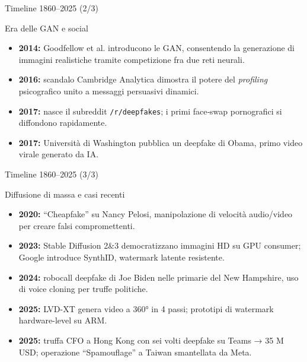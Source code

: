 \documentclass[12pt]{beamer}
\begin{document}
\begin{frame}{Timeline 1860–2025 (2/3)}
  \begin{alertblock}{Era delle GAN e social}
    \begin{itemize}
      \item \textbf{2014:} Goodfellow et al. introducono le GAN, consentendo la generazione di immagini realistiche tramite competizione fra due reti neurali.
      \item \textbf{2016:} scandalo Cambridge Analytica dimostra il potere del \emph{profiling} psicografico unito a messaggi persuasivi dinamici.\cite{cambridge_vox}
      \item \textbf{2017:} nasce il subreddit \texttt{/r/deepfakes}; i primi face‐swap pornografici si diffondono rapidamente.
      \item \textbf{2017:} Università di Washington pubblica un deepfake di Obama, primo video virale generato da IA.\cite{reuters_fake}
    \end{itemize}
  \end{alertblock}
\end{frame}

\begin{frame}{Timeline 1860–2025 (3/3)}
  \begin{alertblock}{Diffusione di massa e casi recenti}
    \begin{itemize}
      \item \textbf{2020:} “Cheapfake” su Nancy Pelosi, manipolazione di velocità audio/video per creare falsi compromettenti.
      \item \textbf{2023:} Stable Diffusion 2\&3 democratizzano immagini HD su GPU consumer; Google introduce SynthID, watermark latente resistente.\cite{fcc_robocall}
      \item \textbf{2024:} robocall deepfake di Joe Biden nelle primarie del New Hampshire, uso di voice cloning per truffe politiche.\cite{fcc_robocall}
      \item \textbf{2025:} LVD-XT genera video a 360° in 4 passi; prototipi di watermark hardware-level su ARM.
      \item \textbf{2025:} truffa CFO a Hong Kong con sei volti deepfake su Teams → 35 M USD; operazione “Spamouflage” a Taiwan smantellata da Meta.\cite{cse_canada_2025}\cite{meta_report}
    \end{itemize}
  \end{alertblock}
\end{frame}

\end{document}
